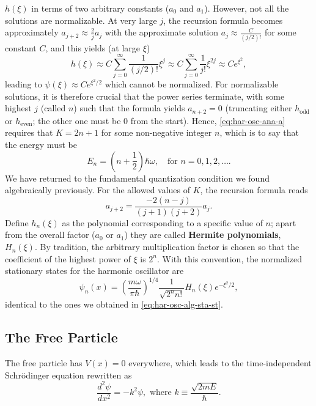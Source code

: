 \documentclass{article}
\begin{document}
$h(\xi)$ in terms of two arbitrary constants ($a_0$ and $a_1$). However, not
all the solutions are normalizable. At very large $j$, the recursion formula
becomes approximately $a_{j+2} \approx \frac{2}{j}a_j$ with the approximate
solution $a_j \approx \frac{C}{(j/2)!}$ for some constant $C$, and this yields
(at large $\xi$) \[
  h(\xi)
  \approx C\sum_{j=0}^{\infty} \frac{1}{(j/2)!}\xi^j
  \approx C\sum_{j=0}^{\infty} \frac{1}{j!}\xi^{2j}
  \approx Ce^{\xi^2},
\] leading to $\psi(\xi) \approx Ce^{\xi^2/2}$ which cannot be normalized. For
normalizable solutions, it is therefore crucial that the power series
terminate, with some highest $j$ (called $n$) such that the formula yields
$a_{n+2} = 0$ (truncating either $h_{\mathrm{odd}}$ or $h_{\mathrm{even}}$; the
other one must be 0 from the start). Hence, \eqref{eq:har-osc-ana-a} requires
that $K = 2n + 1$ for some non-negative integer $n$, which is to say that the
energy must be
\begin{equation} \label{eq:har-osc-ana-ene}
  E_n = \left(n + \frac{1}{2}\right)\hbar\omega, \quad
  \text{for } n = 0, 1, 2, \ldots.
\end{equation}
We have returned to the fundamental quantization condition we found
algebraically previously. For the allowed values of $K$, the recursion formula
reads
\begin{equation} \label{eq:har-osc-ana-a-2}
  a_{j+2} = \frac{-2(n - j)}{(j+1)(j+2)}a_j.
\end{equation}
Define $h_n(\xi)$ as the polynomial corresponding to a specific value of $n$;
apart from the overall factor ($a_0$ or $a_1$) they are called \textbf{Hermite
polynomials}, $H_n(\xi)$. By tradition, the arbitrary multiplication factor is
chosen so that the coefficient of the highest power of $\xi$ is $2^n$. With
this convention, the normalized stationary states for the harmonic oscillator
are
\begin{equation} \label{eq:har-osc-ana-sta-st}
  \boxed{
    \psi_n(x) = \left(\frac{m\omega}{\pi\hbar}\right)^{1/4}
    \frac{1}{\sqrt{2^nn!}}H_n(\xi)e^{-\xi^2/2},
  }
\end{equation}
identical to the ones we obtained in \eqref{eq:har-osc-alg-sta-st}.

\subsection{The Free Particle}

The free particle has $V(x) = 0$ everywhere, which leads to the
time-independent Schr\"{o}dinger equation rewritten as
\begin{equation} \label{eq:free-par}
  \frac{d^2\psi}{dx^2} = -k^2\psi,
  \text{ where } k \equiv \frac{\sqrt{2mE}}{\hbar}.
\end{equation}
\end{document}
